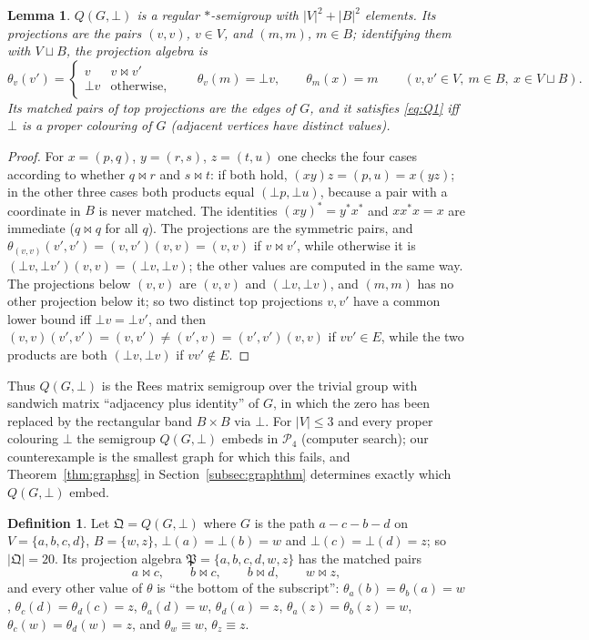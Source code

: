 \documentclass[11pt]{amsart}
\newtheorem{lemma}[theorem]{Lemma}
\theoremstyle{definition}
\newtheorem{definition}[theorem]{Definition}
\renewcommand{\P}{\mathcal{P}}
\newcommand{\mt}{\bowtie}   %
\begin{document}
\begin{lemma}\label{lem:graphsg}
$Q(G,\bot)$ is a regular $*$-semigroup with $|V|^2+|B|^2$ elements. Its projections are the pairs $(v,v)$, $v\in V$, and $(m,m)$, $m\in B$; identifying them with $V\sqcup B$, the projection algebra is
\[
\theta_v(v')=\begin{cases}v&v\mt v'\\ \bot v&\text{otherwise,}\end{cases}\qquad \theta_v(m)=\bot v,\qquad \theta_m(x)=m\qquad(v,v'\in V,\ m\in B,\ x\in V\sqcup B).
\]
Its matched pairs of top projections are the edges of $G$, and it satisfies \eqref{eq:Q1} iff $\bot$ is a proper colouring of $G$ (adjacent vertices have distinct values).
\end{lemma}
\begin{proof}
For $x=(p,q)$, $y=(r,s)$, $z=(t,u)$ one checks the four cases according to whether $q\mt r$ and $s\mt t$: if both hold, $(xy)z=(p,u)=x(yz)$; in the other three cases both products equal $(\bot p,\bot u)$, because a pair with a coordinate in $B$ is never matched. The identities $(xy)^*=y^*x^*$ and $xx^*x=x$ are immediate ($q\mt q$ for all $q$). The projections are the symmetric pairs, and $\theta_{(v,v)}(v',v')=(v,v')(v,v)=(v,v)$ if $v\mt v'$, while otherwise it is $(\bot v,\bot v')(v,v)=(\bot v,\bot v)$; the other values are computed in the same way. The projections below $(v,v)$ are $(v,v)$ and $(\bot v,\bot v)$, and $(m,m)$ has no other projection below it; so two distinct top projections $v,v'$ have a common lower bound iff $\bot v=\bot v'$, and then $(v,v)(v',v')=(v,v')\ne(v',v)=(v',v')(v,v)$ if $vv'\in E$, while the two products are both $(\bot v,\bot v)$ if $vv'\notin E$.
\end{proof}

Thus $Q(G,\bot)$ is the Rees matrix semigroup over the trivial group with sandwich matrix ``adjacency plus identity'' of $G$, in which the zero has been replaced by the rectangular band $B\times B$ via $\bot$. For $|V|\le3$ and every proper colouring $\bot$ the semigroup $Q(G,\bot)$ embeds in $\P_4$ (computer search); our counterexample is the smallest graph for which this fails, and Theorem~\ref{thm:graphsg} in Section~\ref{subsec:graphthm} determines exactly which $Q(G,\bot)$ embed.

\begin{definition}\label{def:Qpath}
Let $\mathfrak Q=Q(G,\bot)$ where $G$ is the path $a-c-b-d$ on $V=\{a,b,c,d\}$, $B=\{w,z\}$, $\bot(a)=\bot(b)=w$ and $\bot(c)=\bot(d)=z$; so $|\mathfrak Q|=20$. Its projection algebra $\mathfrak P=\{a,b,c,d,w,z\}$ has the matched pairs
\[
a\mt c,\qquad b\mt c,\qquad b\mt d,\qquad w\mt z,
\]
and every other value of $\theta$ is ``the bottom of the subscript'': $\theta_a(b)=\theta_b(a)=w$, $\theta_c(d)=\theta_d(c)=z$, $\theta_a(d)=w$, $\theta_d(a)=z$, $\theta_a(z)=\theta_b(z)=w$, $\theta_c(w)=\theta_d(w)=z$, and $\theta_w\equiv w$, $\theta_z\equiv z$.
\end{definition}
\end{document}
